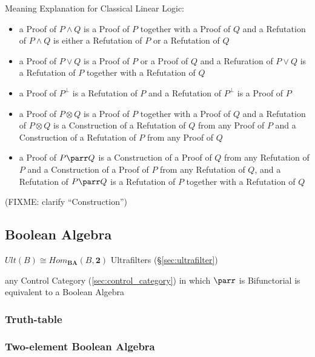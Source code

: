 Meaning Explanation for Classical Linear Logic:
\begin{itemize}
  \item a Proof of $P \wedge Q$ is a Proof of $P$ together with a Proof of $Q$
    and a Refutation of $P \wedge Q$ is either a Refutation of $P$ or a
    Refutation of $Q$
  \item a Proof of $P \vee Q$ is a Proof of $P$ or a Proof of $Q$ and a
    Refuration of $P \vee Q$ is a Refutation of $P$ together with a Refutation
    of $Q$
  \item a Proof of $P^\bot$ is a Refutation of $P$ and a Refutation of $P^\bot$
    is a Proof of $P$
  \item a Proof of $P \otimes Q$ is a Proof of $P$ together with a Proof of $Q$
    and a Refutation of $P \otimes Q$ is a Construction of a Refutation of $Q$
    from any Proof of $P$ and a Construction of a Refutation of $P$ from any
    Proof of $Q$
  \item a Proof of $P \parr Q$ is a Construction of a Proof of $Q$ from any
    Refutation of $P$ and a Construction of a Proof of $P$ from any Refutation
    of $Q$, and a Refutation of $P \parr Q$ is a Refutation of $P$ together
    with a Refutation of $Q$
\end{itemize}

(FIXME: clarify ``Construction'')



\subsection{Boolean Algebra}\label{sec:boolean_algebra}

$Ult(B) \cong Hom_\mathbf{BA}(B,\mathbf{2})$ Ultrafilters
(\S\ref{sec:ultrafilter})

any Control Category (\ref{sec:control_category}) in which $\parr$ is
Bifunctorial is equivalent to a Boolean Algebra \cite{selinger01}



\subsubsection{Truth-table}\label{sec:truth_table}

\subsubsection{Two-element Boolean Algebra}\label{sec:twoelement_boolean}


